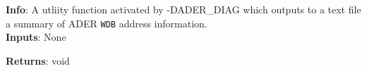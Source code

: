 \textbf{Info}: A utliity function activated by -DADER\_DIAG which outputs to
a text file a summary of ADER \texttt{WDB} address information.\\

\noindent \textbf{Inputs}: None

\noindent \textbf{Returns}: void
